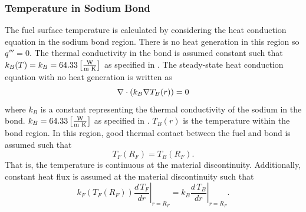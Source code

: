     \subsubsection{Temperature in Sodium Bond}
      The fuel surface temperature is calculated by considering the heat
      conduction equation in the sodium bond region. There is no heat generation
      in this region so $q'''=0$. 
      The thermal conductivity in the bond is assumed constant such that 
      ${k_B(T) = k_B = 64.33 \left[\text{{$\frac{\text{W}}{\text{m K}}$}}\right]}$ as 
      specified in .
      The steady-state heat conduction equation with no heat generation is
      written as
      \begin{equation}
        \label{eq:tc_grad}
        \mathbf{\nabla} \cdot (k_B \mathbf{\nabla} T_B(r)) = 0
      \end{equation}
      where $k_B$ is a constant representing the thermal conductivity of the
      sodium in the bond. $k_B = 64.33 \left[\text{{$\frac{\text{W}}{\text{m K}}$}}\right]$ as
      specified in .
      $T_B(r)$ is the temperature within the bond region.
      In this region, good thermal contact between the fuel and bond is
      assumed such that
      \begin{equation}
        \label{eq:rf_temp_continuity}
        T_F(R_F)=T_B(R_F).
      \end{equation}
      That is, the temperature is 
      continuous at the material discontinuity. Additionally, constant heat flux
      is assumed at the material discontinuity such that
      \begin{equation}
        \label{eq:rf_flux_continuity}
        k_F(T_F(R_F)) \left.\frac{d\,T_F}{dr}\right|_{r=R_F} = 
          k_B \left.\frac{d\,T_B}{dr}\right|_{r=R_F}.
      \end{equation}

